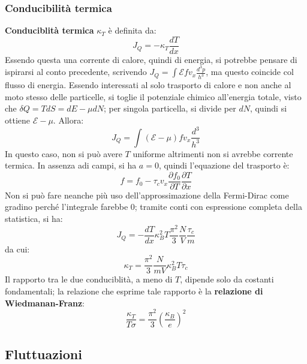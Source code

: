 \documentclass[10pt, a4paper]{scrartcl}
\numberwithin{equation}{subsection}
\theoremstyle{style1}
\begin{document}
\subsubsection{Conducibilit\`a termica}
\textbf{Conduciblit\`a termica} $\kappa _T$ \`e definita da:
\begin{equation}
	J_Q = - \kappa _T \frac{d T}{d x} 
\end{equation}
Essendo questa una corrente di calore, quindi di energia, si potrebbe pensare di ispirarsi al conto precedente, scrivendo $J_Q = \int \mathscr{E} f v_x \frac{d^3 p}{h^3}$, ma questo coincide col flusso di energia.
Essendo interessati al solo trasporto di calore e non anche al moto stesso delle particelle, si toglie il potenziale chimico all'energia totale, visto che $\delta Q = T dS = dE -\mu dN$; per singola particella, si divide per $dN$, quindi si ottiene $\mathscr{E}-\mu $.
Allora:
\begin{equation}
	J_Q = \int (\mathscr{E} -\mu ) f v_x \frac{d^3 }{h^3}
\end{equation}
In questo caso, non si pu\`o avere $T $ uniforme altrimenti non si avrebbe corrente termica.
In assenza adi campi, si ha $a=0$, quindi l'equazione del trasporto \`e:
\begin{equation}
	f = f_0 - \tau _c v_x \frac{\partial f_0}{\partial T}  \frac{\partial T}{\partial x} 
\end{equation}
Non si pu\`o fare neanche pi\`u uso dell'approssimazione della Fermi-Dirac come gradino perch\'e l'integrale farebbe $0$;
tramite conti con espressione completa della statistica, si ha:
\begin{equation}
	J_Q = -\frac{d T}{d x} \kappa _B ^2 T \frac{\pi^2}{3}\frac{N}{V}\frac{\tau _c}{m}
\end{equation}
da cui:
\begin{equation}
	\kappa _T = \frac{\pi^2}{3} \frac{N}{mV}\kappa _B ^2 T \tau _c
\end{equation}
Il rapporto tra le due conduciblit\`a, a meno di $T$, dipende solo da costanti fondamentali;
la relazione che esprime tale rapporto \`e la \textbf{relazione di Wiedmanan-Franz}:
\begin{equation}
	\frac{\kappa _T}{T \sigma } = \frac{\pi^2}{3} \left(\frac{\kappa _B}{e}\right) ^2
\end{equation}

\subsection{Fluttuazioni}
\end{document}
